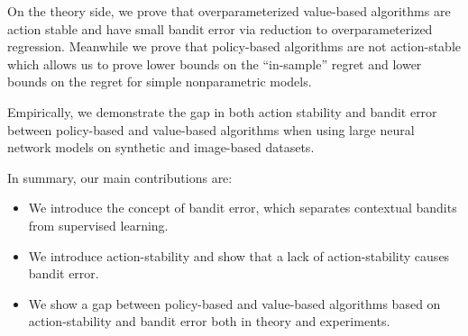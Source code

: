 


On the theory side, we prove that overparameterized value-based algorithms are action stable and have small bandit error via reduction to overparameterized regression.
Meanwhile we prove that policy-based algorithms are not action-stable which allows us to prove lower bounds on the ``in-sample'' regret and lower bounds on the regret for simple nonparametric models.

Empirically, we demonstrate the gap in both action stability and bandit error between policy-based and value-based algorithms when using large neural network models on synthetic and image-based datasets.


In summary, our main contributions are:
\begin{itemize}
    \item We introduce the concept of bandit error, which separates contextual bandits from supervised learning.
    \item We introduce action-stability and show that a lack of action-stability causes bandit error.
    \item We show a gap between policy-based and value-based algorithms based on action-stability and bandit error both in theory and experiments. %
\end{itemize}


